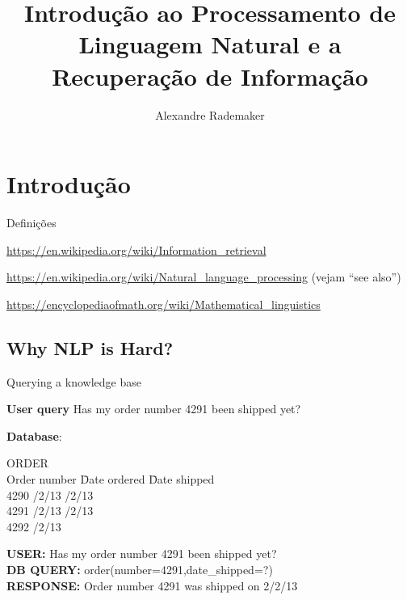 \documentclass[compress]{beamer}
\title{Introdução ao Processamento de Linguagem Natural e a Recuperação de Informação}
\author{Alexandre Rademaker}
\institute[EMAp, FGV]{Escola de Matemática Aplicada, Fundação Getúlio Vargas}
\date
\begin{document}
\begin{frame}
\titlepage
\end{frame}

\section{Introdução}

\begin{frame}{Definições}
  
  \url{https://en.wikipedia.org/wiki/Information_retrieval}

  \url{https://en.wikipedia.org/wiki/Natural_language_processing}
  (vejam ``see also'')

  \url{https://encyclopediaofmath.org/wiki/Mathematical_linguistics}
  
\end{frame}

\subsection{Why NLP is Hard?}

\begin{frame}{Querying a knowledge base}

{\bf User query} Has my order number 4291 been shipped yet?

{\bf Database}:
\begin{tabbing}
ORDER\\ 
Order number \hspace{0.5in} \=Date ordered \hspace{0.5in} \=Date shipped\\[0.05in]
4290              /2/13           /2/13\\
4291              /2/13           /2/13\\
4292              /2/13             
\end{tabbing}
{\bf USER:} Has my order number 4291 been shipped yet?\\
{\bf DB QUERY:} order(number=4291,date\_shipped=?)\\
{\bf RESPONSE:} Order number 4291 was shipped on 2/2/13
\end{frame} 
\end{document}
